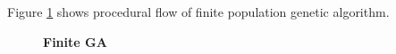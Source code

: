 Figure \ref{FiniteGA} shows procedural flow of finite population genetic algorithm.
\begin{figure}[H]
\begin{center}
\hspace{4pt}
\caption{\textbf{Finite GA} }
\label{FiniteGA}
\end{center}
\end{figure}

